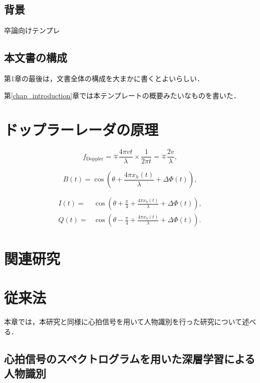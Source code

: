 \section{背景}

卒論向けテンプレ

\section{本文書の構成}

第1章の最後は，文書全体の構成を大まかに書くとよいらしい．

第\ref{chap_introduction}章では本テンプレートの概要みたいなものを書いた．



\chapter{ドップラーレーダの原理}
\begin{equation*} f_{\mathrm{ Doppler}} = \mp \frac {4 \pi vt}{\lambda } \times \frac {1}{2 \pi t} = \mp \frac {2v}{\lambda },\tag{1}\end{equation*}

\begin{equation*} B(t)=\cos \left({\theta +\frac {4\pi x_{h}(t)}{\lambda }+\Delta \Phi (t)}\right),\tag{2}\end{equation*}

\begin{align*} I(t)=&\cos \left({\theta +\frac {\pi }{4}+\frac {4\pi x_{h}(t)}{\lambda }+\Delta \Phi (t)}\right), \tag{3}\\ Q(t)=&\cos \left({\theta -\frac {\pi }{4}+\frac {4\pi x_{h}(t)}{\lambda }+\Delta \Phi (t)}\right).\tag{4}\end{align*}

\chapter{関連研究}

\chapter{従来法}
本章では，本研究と同様に心拍信号を用いて人物識別を行った研究について述べる．

\section{心拍信号のスペクトログラムを用いた深層学習による人物識別\cite{paper:HeartID}}
